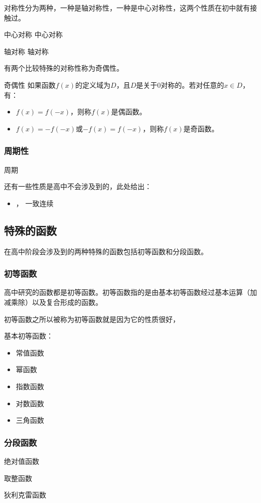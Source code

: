 对称性分为两种，一种是轴对称性，一种是中心对称性，这两个性质在初中就有接触过。

\begin{definition}{中心对称}
中心对称
\end{definition}

\begin{definition}{轴对称}
轴对称
\end{definition}

有两个比较特殊的对称性称为奇偶性。

\begin{definition}{奇偶性}
如果函数$f(x)$的定义域为$D$，且$D$是关于$0$对称的。若对任意的$x\in D$，有：
\begin{itemize}
\item $f(x)=f(-x)$，则称$f(x)$是偶函数。
\item $f(x)=-f(-x)$或$-f(x)=f(-x)$，则称$f(x)$是奇函数。
\end{itemize}
\end{definition}

\subsubsection{周期性}

\begin{definition}{周期}

\end{definition}

还有一些性质是高中不会涉及到的，此处给出：
\begin{itemize}
\item {}， 一致连续
\end{itemize}


\subsection{特殊的函数}

在高中阶段会涉及到的两种特殊的函数包括初等函数和分段函数。

\subsubsection{初等函数}

高中研究的函数都是初等函数。初等函数指的是由基本初等函数经过基本运算（加减乘除）以及复合形成的函数。

初等函数之所以被称为初等函数就是因为它的性质很好，

基本初等函数：
\begin{itemize}
\item 常值函数
\item 幂函数
\item 指数函数
\item 对数函数
\item 三角函数
\end{itemize}

\subsubsection{分段函数}

绝对值函数

取整函数

狄利克雷函数
